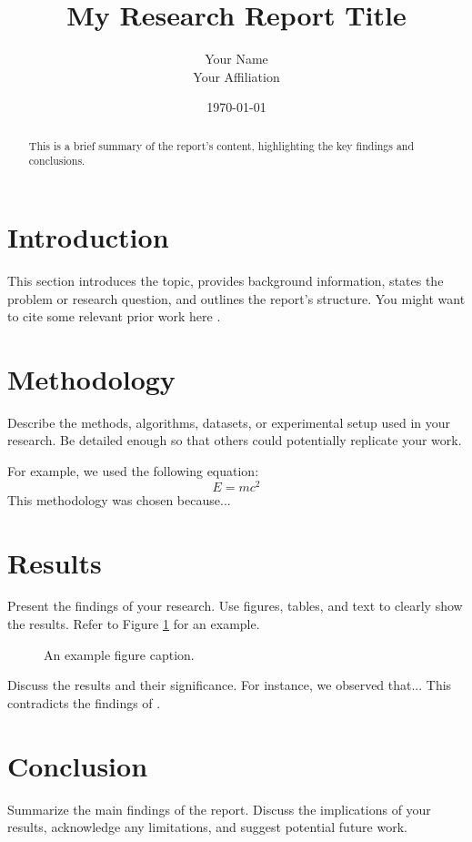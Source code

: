 \documentclass{article}
\title{My Research Report Title}
\author{Your Name \\ Your Affiliation}
\date{\today}
\begin{document}
\maketitle

\begin{abstract}
This is a brief summary of the report's content, highlighting the key findings and conclusions.
\end{abstract}

\section{Introduction}
This section introduces the topic, provides background information, states the problem or research question, and outlines the report's structure. You might want to cite some relevant prior work here \cite{dummy_key1}.

\section{Methodology}
Describe the methods, algorithms, datasets, or experimental setup used in your research. Be detailed enough so that others could potentially replicate your work.

For example, we used the following equation:
\[ E = mc^2 \]
This methodology was chosen because...

\section{Results}
Present the findings of your research. Use figures, tables, and text to clearly show the results.
Refer to Figure \ref{fig:example} for an example.

\begin{figure}[htbp] %
    \centering
    \caption{An example figure caption.}
    \label{fig:example}
\end{figure}

Discuss the results and their significance. For instance, we observed that... This contradicts the findings of \cite{dummy_key2}.

\section{Conclusion}
Summarize the main findings of the report. Discuss the implications of your results, acknowledge any limitations, and suggest potential future work.

\end{document}
